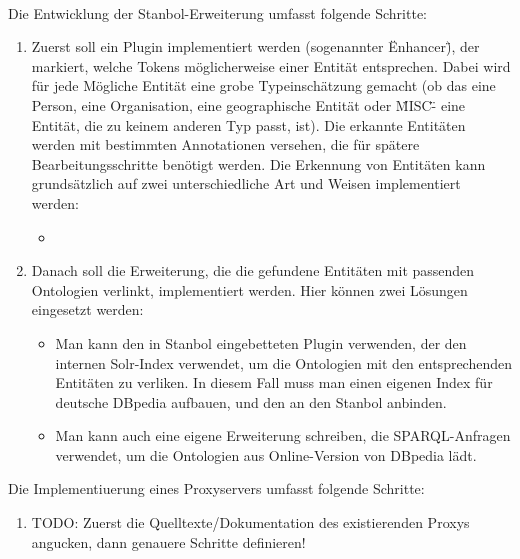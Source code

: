 \paragraph{}
Die Entwicklung der Stanbol-Erweiterung umfasst folgende Schritte:
\begin{enumerate}
\item Zuerst soll ein Plugin implementiert werden (sogenannter \"Enhancer\"), der markiert, welche Tokens möglicherweise einer Entität entsprechen. Dabei wird für jede Mögliche Entität eine grobe Typeinschätzung gemacht (ob das eine Person, eine Organisation, eine geographische Entität oder \"MISC\" - eine Entität, die zu keinem anderen Typ passt, ist). Die erkannte Entitäten werden mit bestimmten Annotationen versehen, die für spätere Bearbeitungsschritte benötigt werden. Die Erkennung von Entitäten kann grundsätzlich auf zwei unterschiedliche Art und Weisen implementiert werden:  
\begin{itemize}
\item 
\end{itemize}
\item Danach soll die Erweiterung, die die gefundene Entitäten mit passenden Ontologien verlinkt, implementiert werden. Hier können zwei Lösungen eingesetzt werden:
\begin{itemize}
\item Man kann den in Stanbol eingebetteten Plugin verwenden, der den internen Solr-Index verwendet, um die Ontologien mit den entsprechenden Entitäten zu verliken. In diesem Fall muss man einen eigenen Index für deutsche DBpedia aufbauen, und den an den Stanbol anbinden.
\item Man kann auch eine eigene Erweiterung schreiben, die SPARQL-Anfragen verwendet, um die Ontologien aus Online-Version von DBpedia lädt.
\end{itemize}
\end{enumerate}

Die Implementiuerung eines Proxyservers umfasst folgende Schritte:
\begin{enumerate}
\item TODO: Zuerst die Quelltexte/Dokumentation des existierenden Proxys angucken, dann genauere Schritte definieren!
\end{enumerate}


